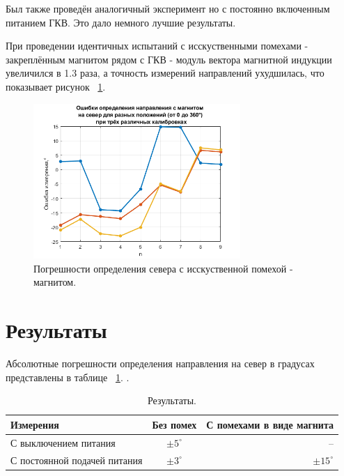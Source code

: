 \documentclass[a4paper,12pt]{article}
\begin{document}
Был также проведён аналогичный эксперимент но с постоянно включенным питанием ГКВ. Это дало немного лучшие результаты.

При проведении идентичных испытаний с исскуственными помехами - закреплённым магнитом рядом с ГКВ - модуль вектора магнитной индукции увеличился в 1.3 раза, а точность измерений направлений ухудшилась, что показывает рисунок ~\ref{fig:errs2}.

\begin{figure}[htb] %
\centering
\includegraphics[width=0.7\textwidth]{PICS/outs_magnet_disturb_error2.png} %
\caption{\label{fig:errs2}Погрешности определения севера с исскуственной помехой - магнитом.} %
\end{figure}

\section{Результаты}
Абсолютные погрешности определения направления на север в градусах представлены в таблице ~\ref{tab:widgets}. .

\begin{table}[h]
\centering
\begin{tabular}{|l|c|r|}
Измерения & Без помех & С помехами в виде магнита \\\hline
С выключением питания &  $\pm 5^\circ$ & -- \\
С постоянной подачей питания & $\pm 3^\circ$  & $\pm 15^\circ$ \\
\end{tabular}
\caption{\label{tab:widgets}Результаты.}
\end{table}
\end{document}
